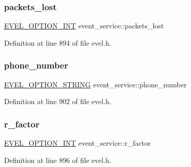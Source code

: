 \hypertarget{structevent__service_abb1de42ce90679db77322fdb2fbc83e2}{}\label{structevent__service_abb1de42ce90679db77322fdb2fbc83e2} 
\subsubsection{\texorpdfstring{packets\+\_\+lost}{packets\_lost}}
{\footnotesize\ttfamily \hyperlink{evel_8h_a452d825778d1c2368a54b8f689a25ba7}{E\+V\+E\+L\+\_\+\+O\+P\+T\+I\+O\+N\+\_\+\+I\+NT} event\+\_\+service\+::packets\+\_\+lost}



Definition at line 894 of file evel.\+h.

\hypertarget{structevent__service_aaae9e1bf66750946d7990c2346f41fe8}{}\label{structevent__service_aaae9e1bf66750946d7990c2346f41fe8} 
\subsubsection{\texorpdfstring{phone\+\_\+number}{phone\_number}}
{\footnotesize\ttfamily \hyperlink{evel_8h_a0de5113a7b72de93c0c7b644f7ea7ec3}{E\+V\+E\+L\+\_\+\+O\+P\+T\+I\+O\+N\+\_\+\+S\+T\+R\+I\+NG} event\+\_\+service\+::phone\+\_\+number}



Definition at line 902 of file evel.\+h.

\hypertarget{structevent__service_aadb3e6a2636c2729ccebd845ea930f8b}{}\label{structevent__service_aadb3e6a2636c2729ccebd845ea930f8b} 
\subsubsection{\texorpdfstring{r\+\_\+factor}{r\_factor}}
{\footnotesize\ttfamily \hyperlink{evel_8h_a452d825778d1c2368a54b8f689a25ba7}{E\+V\+E\+L\+\_\+\+O\+P\+T\+I\+O\+N\+\_\+\+I\+NT} event\+\_\+service\+::r\+\_\+factor}



Definition at line 896 of file evel.\+h.

\hypertarget{structevent__service_ac1ce381c2c76626a0bb7379dc8c188d8}{}\label{structevent__service_ac1ce381c2c76626a0bb7379dc8c188d8} 
